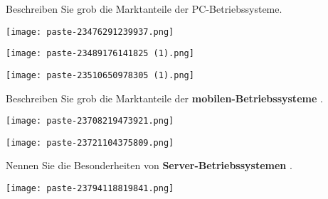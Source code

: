 \documentclass{article}
\begin{document}
\begin{tcolorbox}[colback=white!10!white,colframe=lightgray!75!black,
  savelowerto=\jobname_ex.tex,breakable,enhanced,lines before break=40]

\begin{center}
Beschreiben Sie grob die Marktanteile der PC-Betriebssysteme.

\end{center}

\tcblower

\justifying
\begin{center}
\texttt{[image: paste-23476291239937.png]}
\end{center}
\begin{center}
\texttt{[image: paste-23489176141825 (1).png]}
\end{center}
\begin{center}
\texttt{[image: paste-23510650978305 (1).png]}
\end{center}

\end{tcolorbox}
\begin{tcolorbox}[colback=white!10!white,colframe=lightgray!75!black,
  savelowerto=\jobname_ex.tex,breakable,enhanced,lines before break=40]

\begin{center}
Beschreiben Sie grob die Marktanteile der 
\textbf{mobilen-Betriebssysteme
}.

\end{center}

\tcblower

\justifying
\begin{center}
\texttt{[image: paste-23708219473921.png]}
\end{center}
\begin{center}
\texttt{[image: paste-23721104375809.png]}
\end{center}

\end{tcolorbox}
\begin{tcolorbox}[colback=white!10!white,colframe=lightgray!75!black,
  savelowerto=\jobname_ex.tex,breakable,enhanced,lines before break=40]

\begin{center}
Nennen Sie die Besonderheiten von 
\textbf{Server-Betriebssystemen
}.

\end{center}

\tcblower

\justifying
\begin{center}
\texttt{[image: paste-23794118819841.png]}
\end{center}

\end{tcolorbox}
\end{document}
